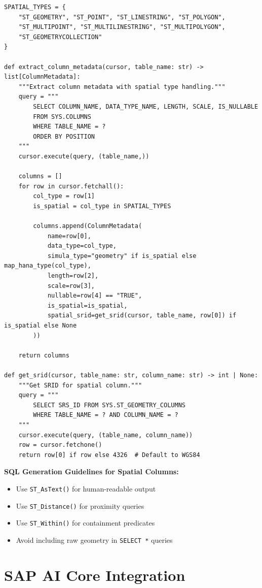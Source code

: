 \begin{lstlisting}[language=jsonx,caption={Spatial type detection and handling}]
SPATIAL_TYPES = {
    "ST_GEOMETRY", "ST_POINT", "ST_LINESTRING", "ST_POLYGON",
    "ST_MULTIPOINT", "ST_MULTILINESTRING", "ST_MULTIPOLYGON",
    "ST_GEOMETRYCOLLECTION"
}

def extract_column_metadata(cursor, table_name: str) -> list[ColumnMetadata]:
    """Extract column metadata with spatial type handling."""
    query = """
        SELECT COLUMN_NAME, DATA_TYPE_NAME, LENGTH, SCALE, IS_NULLABLE
        FROM SYS.COLUMNS
        WHERE TABLE_NAME = ?
        ORDER BY POSITION
    """
    cursor.execute(query, (table_name,))
    
    columns = []
    for row in cursor.fetchall():
        col_type = row[1]
        is_spatial = col_type in SPATIAL_TYPES
        
        columns.append(ColumnMetadata(
            name=row[0],
            data_type=col_type,
            simula_type="geometry" if is_spatial else map_hana_type(col_type),
            length=row[2],
            scale=row[3],
            nullable=row[4] == "TRUE",
            is_spatial=is_spatial,
            spatial_srid=get_srid(cursor, table_name, row[0]) if is_spatial else None
        ))
    
    return columns

def get_srid(cursor, table_name: str, column_name: str) -> int | None:
    """Get SRID for spatial column."""
    query = """
        SELECT SRS_ID FROM SYS.ST_GEOMETRY_COLUMNS
        WHERE TABLE_NAME = ? AND COLUMN_NAME = ?
    """
    cursor.execute(query, (table_name, column_name))
    row = cursor.fetchone()
    return row[0] if row else 4326  # Default to WGS84
\end{lstlisting}

\textbf{SQL Generation Guidelines for Spatial Columns:}
\begin{itemize}
  \item Use \texttt{ST\_AsText()} for human-readable output
  \item Use \texttt{ST\_Distance()} for proximity queries
  \item Use \texttt{ST\_Within()} for containment predicates
  \item Avoid including raw geometry in \texttt{SELECT *} queries
\end{itemize}


\section{SAP AI Core Integration}

